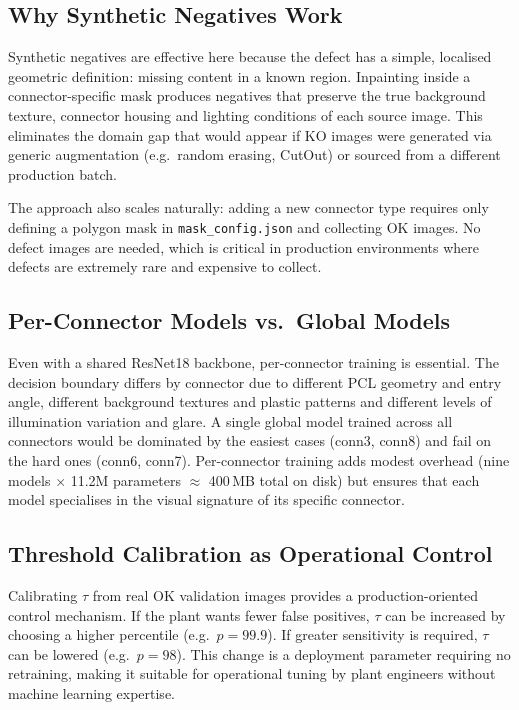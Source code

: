 \documentclass[11pt,a4paper,draft]{article}
\begin{document}
\subsection{Why Synthetic Negatives Work}

Synthetic negatives are effective here because the defect has a simple, localised geometric definition: missing content in a known region. Inpainting inside a connector-specific mask produces negatives that preserve the true background texture, connector housing and lighting conditions of each source image. This eliminates the domain gap that would appear if KO images were generated via generic augmentation (e.g.\ random erasing, CutOut) or sourced from a different production batch.

The approach also scales naturally: adding a new connector type requires only defining a polygon mask in \texttt{mask\_config.json} and collecting OK images. No defect images are needed, which is critical in production environments where defects are extremely rare and expensive to collect.

\subsection{Per-Connector Models vs.\ Global Models}

Even with a shared ResNet18 backbone, per-connector training is essential. The decision boundary differs by connector due to different PCL geometry and entry angle, different background textures and plastic patterns and different levels of illumination variation and glare. A single global model trained across all connectors would be dominated by the easiest cases (conn3, conn8) and fail on the hard ones (conn6, conn7). Per-connector training adds modest overhead (nine models $\times$ 11.2M parameters $\approx$ 400\,MB total on disk) but ensures that each model specialises in the visual signature of its specific connector.

\subsection{Threshold Calibration as Operational Control}

Calibrating $\tau$ from real OK validation images provides a production-oriented control mechanism. If the plant wants fewer false positives, $\tau$ can be increased by choosing a higher percentile (e.g.\ $p=99.9$). If greater sensitivity is required, $\tau$ can be lowered (e.g.\ $p=98$). This change is a deployment parameter requiring no retraining, making it suitable for operational tuning by plant engineers without machine learning expertise.
\end{document}
